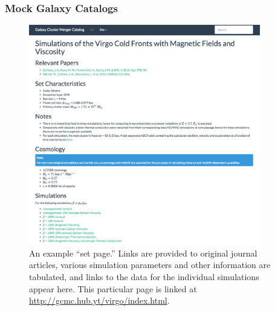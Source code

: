 \documentclass{emulateapj}
\begin{document}
\subsubsection{Mock Galaxy Catalogs}\label{sec:galaxies}

\begin{figure}
\begin{center}
\includegraphics[width=0.9\textwidth]{set_page.eps}
\caption{An example ``set page.'' Links are provided to original journal articles, various simulation parameters and other information are tabulated, and links to the data for the individual simulations appear here. This particular page is linked at \url{http://gcmc.hub.yt/virgo/index.html}.}
\end{center}
\end{figure}
\end{document}
